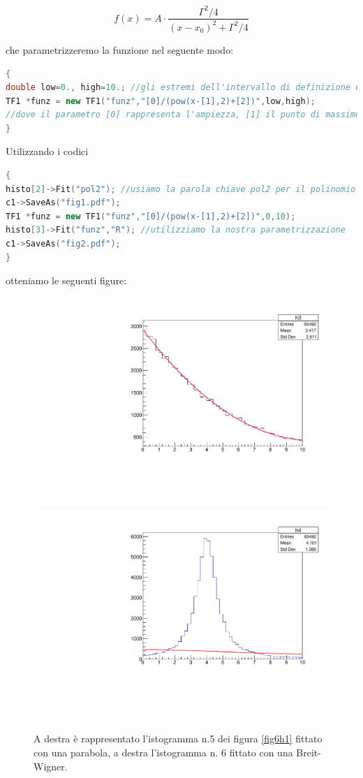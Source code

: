 \documentclass[11pt,fleqn]{book} %
\begin{document}
$$f(x) = A\cdot \frac{\Gamma^2/4}{{(x-x_0)}^2+\Gamma^2/4}$$

che parametrizzeremo la funzione nel seguente modo:


\begin{lstlisting}[language=c++]
{
double low=0., high=10.; //gli estremi dell'intervallo di definizione della funzione
TF1 *funz = new TF1("funz","[0]/(pow(x-[1],2)+[2])",low,high);
//dove il parametro [0] rappresenta l'ampiezza, [1] il punto di massimo, [2] la semi-ampiezza.
}
\end{lstlisting}

Utilizzando i codici 
\begin{lstlisting}[language=c++]
{
histo[2]->Fit("pol2"); //usiamo la parola chiave pol2 per il polinomio di secondo grado
c1->SaveAs("fig1.pdf");
TF1 *funz = new TF1("funz","[0]/(pow(x-[1],2)+[2])",0,10);
histo[3]->Fit("funz","R"); //utilizziamo la nostra parametrizzazione
c1->SaveAs("fig2.pdf");
}
\end{lstlisting}
otteniamo le seguenti figure:

\begin{figure}[h]
\centering
\includegraphics[scale=0.35]{Pictures/fitexpsbagliato2.pdf}
\includegraphics[scale=0.35]{Pictures/fitebwsballata.pdf}
\caption{A destra è rappresentato l'istogramma n.5 dei figura \ref{fig6h1} fittato con una parabola, a destra l'istogramma n. 6 fittato con una Breit-Wigner. \label{fitbabbo3}}
\end{figure}
\end{document}
